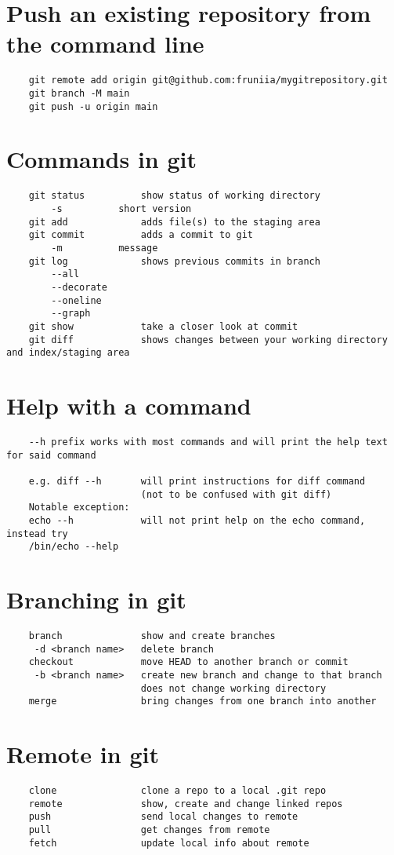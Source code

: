 \documentclass[10pt, a4paper]{article}
\begin{document}
\section*{Push an existing repository from the command line}
\begin{verbatim}
    git remote add origin git@github.com:fruniia/mygitrepository.git
    git branch -M main
    git push -u origin main
\end{verbatim}
\newpage
\section*{Commands in git}
\begin{verbatim}
    git status          show status of working directory
        -s          short version
    git add             adds file(s) to the staging area
    git commit          adds a commit to git
        -m          message
    git log             shows previous commits in branch
        --all
        --decorate
        --oneline
        --graph
    git show            take a closer look at commit
    git diff            shows changes between your working directory and index/staging area
\end{verbatim}
\section*{Help with a command}
\begin{verbatim}
    --h prefix works with most commands and will print the help text for said command

    e.g. diff --h       will print instructions for diff command 
                        (not to be confused with git diff)
    Notable exception:
    echo --h            will not print help on the echo command, instead try
    /bin/echo --help    
\end{verbatim}
\section*{Branching in git}
\begin{verbatim}
    branch              show and create branches
     -d <branch name>   delete branch          
    checkout            move HEAD to another branch or commit
     -b <branch name>   create new branch and change to that branch
                        does not change working directory
    merge               bring changes from one branch into another
\end{verbatim}
\section*{Remote in git}
\begin{verbatim}
    clone               clone a repo to a local .git repo     
    remote              show, create and change linked repos
    push                send local changes to remote
    pull                get changes from remote
    fetch               update local info about remote
\end{verbatim}
\end{document}
